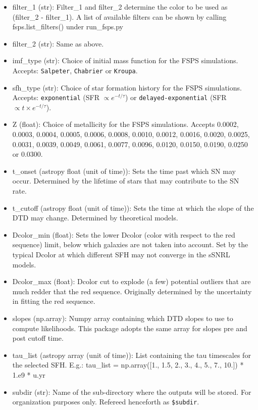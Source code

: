 \documentclass[manuscript]{aastex}
\begin{document}
\begin{itemize}
\item filter\_1 (str): Filter\_1 and filter\_2 determine the color to be used as (filter\_2 - filter\_1). A list of available filters can be shown by calling fsps.list\_filters() under run\_fsps.py
\item filter\_2 (str): Same as above.
\item imf\_type (str): Choice of initial mass function for the FSPS simulations. Accepts: \texttt{Salpeter}, \texttt{Chabrier} or \texttt{Kroupa}.
\item sfh\_type (str): Choice of star formation history for the FSPS simulations. Accepts: \texttt{exponential} (SFR $\propto e^{-t/\tau}$) or \texttt{delayed-exponential} (SFR $\propto t\times e^{-t/\tau}$).
\item Z (float): Choice of metallicity for the FSPS simulations. Accepts 0.0002, 0.0003, 0.0004, 0.0005, 0.0006, 0.0008, 0.0010, 0.0012, 0.0016, 0.0020, 0.0025, 0.0031, 0.0039, 0.0049, 0.0061, 0.0077, 0.0096, 0.0120, 0.0150, 0.0190, 0.0250 or 0.0300.
\item t\_onset (astropy float (unit of time)): Sets the time past which SN may occur. Determined by the lifetime of stars that may contribute to the SN rate.
\item t\_cutoff (astropy float (unit of time)): Sets the time at which the slope of the DTD may change. Determined by theoretical models.
\item Dcolor\_min (float): Sets the lower Dcolor (color with respect to the red sequence) limit, below which galaxies are not taken into account. Set by the typical Dcolor at which different SFH may not converge in the sSNRL models.
\item Dcolor\_max (float): Dcolor cut to explode (a few) potential outliers that are much redder that the red sequence. Originally determined by the uncertainty in fitting the red sequence.
\item slopes (np.array): Numpy array containing which DTD slopes to use to compute likelihoods. This package adopts the same array for slopes pre and post cutoff time.
\item tau\_list (astropy array (unit of time)): List containing the tau timescales for the selected SFH. E.g.: tau\_list = np.array([1., 1.5, 2., 3., 4., 5., 7., 10.]) * 1.e9 * u.yr
\item subdir (str): Name of the sub-directory where the outputs will be stored. For organization purposes only. Refereed henceforth as \texttt{\$subdir}.
\end{itemize}
\end{document}
